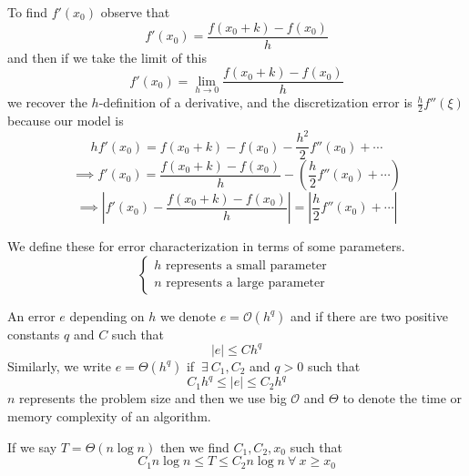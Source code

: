 \documentclass[12pt]{scrartcl}
\renewcommand{\O}{\mathcal{O}}
\begin{document}
\begin{note}
  To find $f'(x_0)$ observe that 
  \[f'(x_0) = \frac{f(x_0 + k) - f(x_0)}{h}\] 
  and then if we take the limit of this 
  \[f'(x_0) = \lim_{h\to 0} \frac{f(x_0 + k) - f(x_0)}{h}\]
  we recover the $h$-definition of a derivative, and the discretization error is 
  $\frac{h}{2}f''(\xi)$ because our model is 
  \[hf'(x_0) = f(x_0 + k) - f(x_0) - \frac{h^2}{2}f''(x_0) + \cdots\]
  \[\implies f'(x_0) = \frac{f(x_0 + k) - f(x_0)}{h} - \left(\frac{h}{2}f''(x_0) + \cdots\right)\]
  \[\implies \left| f'(x_0) - \frac{f(x_0 + k) - f(x_0)}{h} \right| = \left| \frac{h}{2}f''(x_0) + \cdots \right|\]
\end{note}

\begin{definition}
  We define these for error characterization in terms of some parameters.
  \[\begin{cases}
    h \text{ represents a small parameter }\\
    n \text{ represents a large parameter }
  \end{cases}\]
\end{definition}

\begin{note}
  An error $e$ depending on $h$ we denote $e = \mathcal{O}(h^q)$ and if there are two positive constants 
  $q$ and $C$ such that 
  \[|e| \leq Ch^q\]
  Similarly, we write $e = \Theta(h^q)$ if $\ \exists \ C_1, C_2$ and $q > 0$
  such that 
  \[C_1h^q \leq |e| \leq C_2h^q\]
  $n$ represents the problem size and then we use big $\O$ and $\Theta$ to denote the time or memory complexity of an algorithm.
\end{note}

\begin{example}
  If we say $T = \Theta(n\log n)$ then we find $C_1, C_2, x_0$ such that 
  \[C_1n\log n \leq T \leq C_2n \log n \ \forall \ x \geq x_0\]
\end{example}
\end{document}
